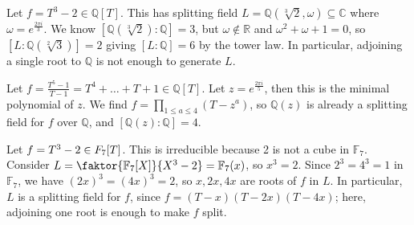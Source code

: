 \begin{example}
	Let \( f = T^3 - 2 \in \mathbb Q[T] \).
	This has splitting field \( L = \mathbb Q(\sqrt[3]{2}, \omega) \subseteq \mathbb C \) where \( \omega = e^{\frac{2\pi i}{3}} \).
	We know \( [\mathbb Q(\sqrt[3]{2}) : \mathbb Q] = 3 \), but \( \omega \not\in \mathbb R \) and \( \omega^2 + \omega + 1 = 0 \), so \( [L : \mathbb Q(\sqrt[2]{3})] = 2 \) giving \( [L : \mathbb Q] = 6 \) by the tower law.
	In particular, adjoining a single root to \( \mathbb Q \) is not enough to generate \( L \).
\end{example}
\begin{example}
	Let \( f = \frac{T^5 - 1}{T - 1} = T^4 + \dots + T + 1 \in \mathbb Q[T] \).
	Let \( z = e^{\frac{2\pi i}{5}} \), then this is the minimal polynomial of \( z \).
	We find \( f = \prod_{1 \leq a \leq 4} (T - z^a) \), so \( \mathbb Q(z) \) is already a splitting field for \( f \) over \( \mathbb Q \), and \( [\mathbb Q(z) : \mathbb Q] = 4 \).
\end{example}
\begin{example}
	Let \( f = T^3 - 2 \in \mathbb \mathbb F_7[T] \).
	This is irreducible because 2 is not a cube in \( \mathbb F_7 \).
	Consider \( L = \faktor{\mathbb F_7[X]}{X^3 - 2} = \mathbb F_7(x) \), so \( x^3 = 2 \).
	Since \( 2^3 = 4^3 = 1 \) in \( \mathbb F_7 \), we have \( (2x)^3 = (4x)^3 = 2 \), so \( x, 2x, 4x \) are roots of \( f \) in \( L \).
	In particular, \( L \) is a splitting field for \( f \), since \( f = (T - x)(T - 2x)(T - 4x) \); here, adjoining one root is enough to make \( f \) split.
\end{example}
